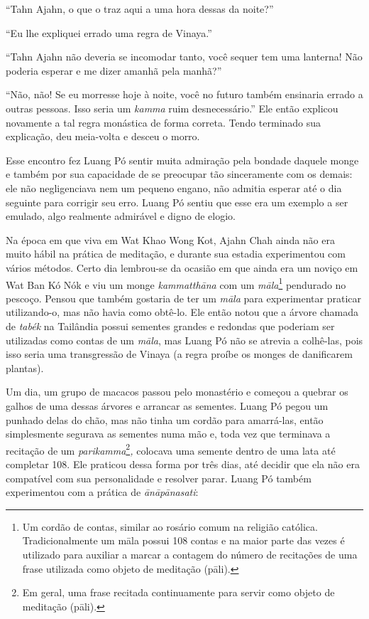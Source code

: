 ``Tahn Ajahn, o que o traz aqui a uma hora dessas da noite?''

``Eu lhe expliquei errado uma regra de Vinaya.''

``Tahn Ajahn não deveria se incomodar tanto, você sequer tem uma
lanterna! Não poderia esperar e me dizer amanhã pela manhã?''

``Não, não! Se eu morresse hoje à noite, você no futuro também ensinaria
errado a outras pessoas. Isso seria um \emph{kamma} ruim
desnecessário.'' Ele então explicou novamente a tal regra monástica de
forma correta. Tendo terminado sua explicação, deu meia-volta e desceu o
morro.

Esse encontro fez Luang Pó sentir muita admiração pela bondade daquele
monge e também por sua capacidade de se preocupar tão sinceramente com
os demais: ele não negligenciava nem um pequeno engano, não admitia
esperar até o dia seguinte para corrigir seu erro. Luang Pó sentiu que
esse era um exemplo a ser emulado, algo realmente admirável e digno de
elogio.

Na época em que viva em Wat Khao Wong Kot, Ajahn Chah ainda não era
muito hábil na prática de meditação, e durante sua estadia experimentou
com vários métodos. Certo dia lembrou-se da ocasião em que ainda era um
noviço em Wat Ban Kó Nók e viu um monge \emph{kammatthāna} com um
\emph{māla}\footnote{Um cordão de contas, similar ao rosário comum na
  religião católica. Tradicionalmente um māla possui 108 contas e na
  maior parte das vezes é utilizado para auxiliar a marcar a contagem do
  número de recitações de uma frase utilizada como objeto de meditação
  (pāli).} pendurado no pescoço. Pensou que também gostaria de ter um
\emph{māla} para experimentar praticar utilizando-o, mas não havia como
obtê-lo. Ele então notou que a árvore chamada de \emph{tabék} na
Tailândia possui sementes grandes e redondas que poderiam ser utilizadas
como contas de um \emph{māla}, mas Luang Pó não se atrevia a colhê-las,
pois isso seria uma transgressão de Vinaya (a regra proíbe os monges de
danificarem plantas).

Um dia, um grupo de macacos passou pelo monastério e começou a quebrar
os galhos de uma dessas árvores e arrancar as sementes. Luang Pó pegou
um punhado delas do chão, mas não tinha um cordão para amarrá-las, então
simplesmente segurava as sementes numa mão e, toda vez que terminava a
recitação de um \emph{parikamma}\footnote{Em geral, uma frase recitada
  continuamente para servir como objeto de meditação (pāli).}\emph{,}
colocava uma semente dentro de uma lata até completar 108. Ele praticou
dessa forma por três dias, até decidir que ela não era compatível com
sua personalidade e resolver parar. Luang Pó também experimentou com a
prática de \emph{ānāpānasati}:

